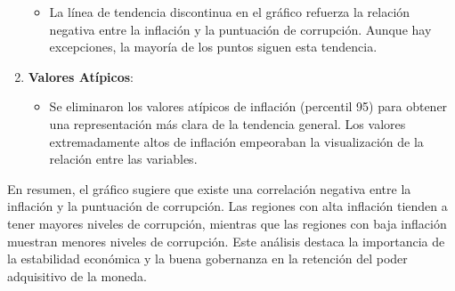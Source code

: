 \documentclass[
]{article}
\providecommand{\tightlist}{%
  \setlength{\itemsep}{0pt}\setlength{\parskip}{0pt}}
\begin{document}
\begin{enumerate}
  \begin{itemize}
  \tightlist
  \item
    La línea de tendencia discontinua en el gráfico refuerza la relación
    negativa entre la inflación y la puntuación de corrupción. Aunque
    hay excepciones, la mayoría de los puntos siguen esta tendencia.
  \end{itemize}
\item
  \textbf{Valores Atípicos}:

  \begin{itemize}
  \tightlist
  \item
    Se eliminaron los valores atípicos de inflación (percentil 95) para
    obtener una representación más clara de la tendencia general. Los
    valores extremadamente altos de inflación empeoraban la
    visualización de la relación entre las variables.
  \end{itemize}
\end{enumerate}

En resumen, el gráfico sugiere que existe una correlación negativa entre
la inflación y la puntuación de corrupción. Las regiones con alta
inflación tienden a tener mayores niveles de corrupción, mientras que
las regiones con baja inflación muestran menores niveles de corrupción.
Este análisis destaca la importancia de la estabilidad económica y la
buena gobernanza en la retención del poder adquisitivo de la moneda.
\end{document}
